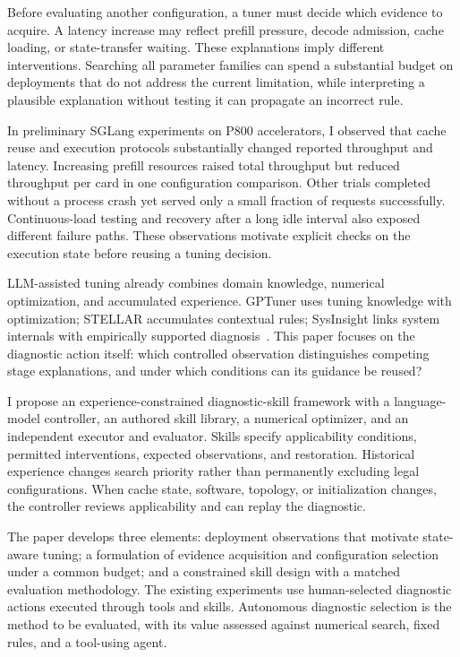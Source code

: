 \documentclass[preprint,12pt]{elsarticle}
\begin{document}
Before evaluating another configuration, a tuner must decide which evidence to acquire. A latency increase may reflect prefill pressure, decode admission, cache loading, or state-transfer waiting. These explanations imply different interventions. Searching all parameter families can spend a substantial budget on deployments that do not address the current limitation, while interpreting a plausible explanation without testing it can propagate an incorrect rule.

In preliminary SGLang experiments on P800 accelerators, I observed that cache reuse and execution protocols substantially changed reported throughput and latency. Increasing prefill resources raised total throughput but reduced throughput per card in one configuration comparison. Other trials completed without a process crash yet served only a small fraction of requests successfully. Continuous-load testing and recovery after a long idle interval also exposed different failure paths. These observations motivate explicit checks on the execution state before reusing a tuning decision.

LLM-assisted tuning already combines domain knowledge, numerical optimization, and accumulated experience. GPTuner uses tuning knowledge with optimization; STELLAR accumulates contextual rules; SysInsight links system internals with empirically supported diagnosis~\cite{gptuner2024,stellar2025,sysinsight2026}. This paper focuses on the diagnostic action itself: which controlled observation distinguishes competing stage explanations, and under which conditions can its guidance be reused?

I propose an experience-constrained diagnostic-skill framework with a language-model controller, an authored skill library, a numerical optimizer, and an independent executor and evaluator. Skills specify applicability conditions, permitted interventions, expected observations, and restoration. Historical experience changes search priority rather than permanently excluding legal configurations. When cache state, software, topology, or initialization changes, the controller reviews applicability and can replay the diagnostic.

The paper develops three elements: deployment observations that motivate state-aware tuning; a formulation of evidence acquisition and configuration selection under a common budget; and a constrained skill design with a matched evaluation methodology. The existing experiments use human-selected diagnostic actions executed through tools and skills. Autonomous diagnostic selection is the method to be evaluated, with its value assessed against numerical search, fixed rules, and a tool-using agent.
\end{document}
